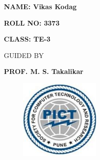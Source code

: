\documentclass[12pt]{article}
\begin{document}
\begin{Center}
{\fontsize{14pt}{16.8pt}\selectfont  \par}
\end{Center}\par

\begin{Center}
{\fontsize{16pt}{19.2pt}\selectfont \textbf{NAME: Vikas Kodag}\par}
\end{Center}\par

\begin{Center}
{\fontsize{16pt}{19.2pt}\selectfont \textbf{ROLL NO: 3373}\par}
\end{Center}\par

\begin{Center}
{\fontsize{16pt}{19.2pt}\selectfont \textbf{CLASS: TE-3}\par}
\end{Center}\par

\begin{Center}
{\fontsize{7pt}{8.4pt}\selectfont \textbf{ }\par}
\end{Center}\par

\begin{Center}
{\fontsize{14pt}{16.8pt}\selectfont GUIDED BY\par}
\end{Center}\par

\begin{Center}
{\fontsize{16pt}{19.2pt}\selectfont \textbf{PROF. M. S. Takalikar}\par}
\end{Center}\par




\begin{figure}[H]
	\begin{Center}
		\includegraphics[width=1.57in,height=1.57in]{./media/image11.jpg}
	\end{Center}
\end{figure}
\end{document}
